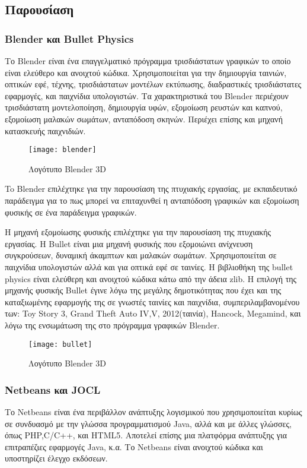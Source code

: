 \subsection{Παρουσίαση}
\subsubsection{Blender και Bullet Physics}
Το Blender είναι ένα επαγγελματικό πρόγραμμα τρισδιάστατων γραφικών το οποίο είναι ελεύθερο και ανοιχτού κώδικα. Χρησιμοποιείται για την δημιουργία ταινιών, οπτικών εφέ, τέχνης, τρισδιάστατων μοντέλων εκτύπωσης, διαδραστικές τρισδιάστατες εφαρμογές, και παιχνίδια υπολογιστών. Τα χαρακτηριστικά του Blender περιέχουν τρισδιάστατη μοντελοποίηση, δημιουργία υφών, εξομοίωση ρευστών και καπνού, εξομοίωση μαλακών σωμάτων, ανταπόδοση σκηνών. Περιέχει επίσης και μηχανή κατασκευής παιχνιδιών.
\begin{figure}[h]
\centering
\texttt{[image: blender]}
\caption{Λογότυπο Blender 3D}
\end{figure}

To Blender επιλέχτηκε για την παρουσίαση της πτυχιακής εργασίας, με εκπαιδευτικό παράδειγμα για το πως μπορεί να επιταχυνθεί η ανταπόδοση γραφικών και εξομοίωση φυσικής σε ένα παράδειγμα γραφικών.

H μηχανή εξομοίωσης φυσικής επιλέχτηκε για την παρουσίαση της πτυχιακής εργασίας. H Bullet είναι μια μηχανή φυσικής που εξομοιώνει ανίχνευση συγκρούσεων, δυναμική άκαμπτων και μαλακών σωμάτων. Χρησιμοποιείται σε παιχνίδια υπολογιστών αλλά και για οπτικά εφέ σε ταινίες. Η βιβλιοθήκη της bullet physics είναι ελεύθερη και ανοιχτού κώδικα κάτω από την άδεια zlib. Η επιλογή της μηχανής φυσικής Bullet έγινε λόγω της μεγάλης δημοτικότητας που έχει και της καταξιωμένης εφαρμογής της σε γνωστές ταινίες και παιχνίδια, συμπεριλαμβανομένου των: Toy Story 3, Grand Theft Auto IV,V, 2012(ταινία), Hancock, Megamind, και λόγω της ενσωμάτωση της στο πρόγραμμα γραφικών Blender.

\begin{figure}[h]
\centering
\texttt{[image: bullet]}
\caption{Λογότυπο Blender 3D}
\end{figure}

\subsubsection{Netbeans και JOCL}
Το Netbeans είναι ένα περιβάλλον ανάπτυξης λογισμικού που χρησιμοποιείται κυρίως σε συνδυασμό με την γλώσσα προγραμματισμού Java, αλλά και με άλλες γλώσσες, όπως PHP,C/C++, και HTML5. Αποτελεί επίσης μια πλατφόρμα ανάπτυξης για επιτραπέζιες εφαρμογές Java, κ.α. Το Netbeans είναι ανοιχτού κώδικα και υποστηρίζει έλεγχο εκδόσεων.

